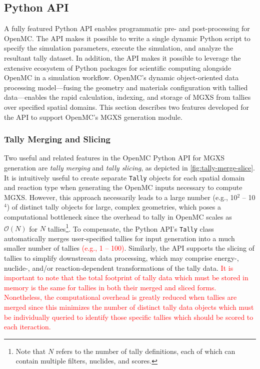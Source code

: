 \subsection{Python API}
\label{subsec:pyapi}

A fully featured Python API enables programmatic pre- and post-processing for OpenMC\cite{boyd2016bigdata}. The API makes it possible to write a single dynamic Python script to specify the simulation parameters, execute the simulation, and analyze the resultant tally dataset. In addition, the API makes it possible to leverage the extensive ecosystem of Python packages for scientific computing alongside OpenMC in a simulation workflow. OpenMC's dynamic object-oriented data processing model---fusing the geometry and materials configuration with tallied data---enables the rapid calculation, indexing, and storage of MGXS from tallies over specified spatial domains. This section describes two features developed for the API to support OpenMC's MGXS generation module.


\subsubsection{Tally Merging and Slicing}
\label{subsubsec:tally-slice-merge}

Two useful and related features in the OpenMC Python API for MGXS generation are \emph{tally merging} and \emph{tally slicing}, as depicted in \cref{fig:tally-merge-slice}. It is intuitively useful to create separate \texttt{Tally} objects for each spatial domain and reaction type when generating the OpenMC inputs necessary to compute MGXS. However, this approach necessarily leads to a large number (e.g., 10$^2$ -- 10$^4$) of distinct tally objects for large, complex geometries, which poses a computational bottleneck since the overhead to tally in OpenMC scales as $\mathcal{O}(N)$ for $N$ tallies\footnote{Note that $N$ refers to the number of tally definitions, each of which can contain multiple filters, nuclides, and scores.}. To compensate, the Python API's \texttt{Tally} class automatically merges user-specified tallies for input generation into a much smaller number of tallies \textcolor{red}{(e.g., 1 -- 100)}. Similarly, the API supports the slicing of tallies to simplify downstream data processing, which may comprise energy-, nuclide-, and/or reaction-dependent transformations of the tally data. \textcolor{red}{It is important to note that the total footprint of tally data which must be stored in memory is the same for tallies in both their merged and sliced forms. Nonetheless, the computational overhead is greatly reduced when tallies are merged since this minimizes the number of distinct tally data objects which must be individually queried to identify those specific tallies which should be scored to each iteraction.}

